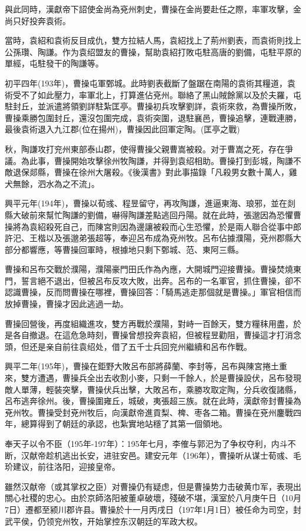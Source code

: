 與此同時，漢獻帝下詔使金尚為兗州刺史，曹操在金尚要赴任之際，率軍攻擊，金尚只好投奔袁術。

當時，袁紹和袁術反目成仇，雙方拉結人馬，袁紹找上了荊州劉表，而袁術則找上公孫瓚、陶謙。作为袁绍盟友的曹操，幫助袁紹打敗屯駐高唐的劉備，屯駐平原的單經，屯駐發干的陶謙等。

初平四年(193年)，曹操屯軍鄄城。此時劉表截斷了盤踞在南陽的袁術其糧道，袁術受不了如此壓力，率軍北上，打算進佔兗州。聯絡了黑山賊餘黨以及於夫羅，屯駐封丘，並派遣將領劉詳駐紮匡亭。曹操初兵攻擊劉詳，袁術來救，為曹操所敗，曹操乘勝包圍封丘，還沒包圍完成，袁術突圍，退駐襄邑，曹操追擊，連戰連勝，最後袁術退入九江郡(位在揚州)，曹操因此回軍定陶。(匡亭之戰)

秋，陶謙攻打兖州東部泰山郡，使得曹操父親曹嵩被殺。对于曹嵩之死，存在爭議。為此事，曹操開始攻擊徐州牧陶謙，并得到袁绍相助。曹操打到彭城，陶謙不敵退保郯縣，曹操在徐州大屠殺。《後漢書》對此事描錄「凡殺男女數十萬人，雞犬無餘，泗水為之不流」。

興平元年(194年)，曹操以荀彧、程昱留守，再攻陶謙，進逼東海、琅邪，並在剡縣大破前來幫忙陶謙的劉備，嚇得陶謙差點逃回丹陽。就在此時，張邈因為恐懼曹操將為袁紹殺死自己，而陳宮則因為邊讓被殺而心生恐懼，於是兩人聯合從事中郎許汜、王楷以及張邈弟張超等，奉迎呂布成為兗州牧。呂布佔據濮陽，兗州郡縣大部分都響應，等曹操回軍時，根據地只剩下鄄城、范、東阿三縣。

曹操和呂布交戰於濮陽，濮陽豪門田氏作為內應，大開城門迎接曹操。曹操焚燒東門，誓言絕不退出，但被呂布反攻大敗，出奔。呂布的一名軍官，抓住曹操，卻不認識曹操，反而問曹操在哪裡，曹操回答：「騎馬逃走那個就是曹操。」軍官相信而放掉曹操，曹操才因此逃過一劫。

曹操回營後，再度組織進攻，雙方再戰於濮陽，對峙一百餘天，雙方糧秣用盡，於是各自撤退。在這危急時刻，曹操曾想投奔袁紹，但被程昱勸阻，曹操這才打消念頭，但还是亲自前往袁绍处，借了五千士兵回兖州繼續和呂布作戰。

興平二年(195年)，曹操在鉅野大敗呂布部將薛蘭、李封等，呂布與陳宮捲土重來，雙方遭遇，曹操兵全出去收割小麥，只剩一千餘人，於是曹操設伏，呂布發現敵人單薄，輕裝突擊，曹操伏兵出擊，大敗呂布，乘勝攻取定陶，分兵收復諸縣，呂布逃奔徐州。後，曹操圍雍丘，城破，夷張超三族。就在此時，漢獻帝封曹操為兗州牧。曹操受封兗州牧后，向漢獻帝進貢梨、椑、枣各二箱。曹操在兗州鏖戰四年，總算得到了朝廷的承認，也紮實地站穩了其第一個領地。

奉天子以令不臣（195年-197年）：195年七月，李傕与郭汜为了争权夺利，内斗不断，汉献帝趁机逃出长安，进驻安邑。建安元年（196年），曹操听从谋士荀彧、毛玠建议，前往洛阳，迎接皇帝。

雖然汉献帝（或其掌权之臣）对曹操仍有疑虑，但是曹操势力击破黄巾军，表現出關心社稷的忠心。由於京師洛阳被董卓破壞，殘破不堪，漢室於八月庚午日（10月7日）遷都至颍川郡许县。曹操於十一月丙戌日（197年1月1日）被任命为司空，封武平侯，仍领兖州牧，开始掌控东汉朝廷的军政大权。

